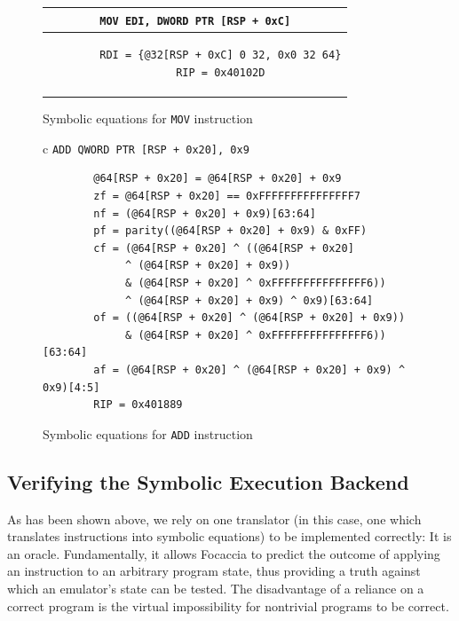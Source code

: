 \begin{figure}[htbp]
    \centering
    \begin{tabular}{c}
    \texttt{MOV        EDI, DWORD PTR [RSP + 0xC]} \\
    \midrule
    \begin{lstlisting}
        RDI = {@32[RSP + 0xC] 0 32, 0x0 32 64}
        RIP = 0x40102D
    \end{lstlisting}
    \end{tabular}
    \caption{Symbolic equations for \texttt{MOV} instruction}\label{fig:symb_equation_mov}
\end{figure}

\begin{figure}[htbp]
    \centering
    \begin{tabular}{c}
    \texttt{ADD        QWORD PTR [RSP + 0x20], 0x9} \\
    \midrule
    \begin{lstlisting}
        @64[RSP + 0x20] = @64[RSP + 0x20] + 0x9
        zf = @64[RSP + 0x20] == 0xFFFFFFFFFFFFFFF7
        nf = (@64[RSP + 0x20] + 0x9)[63:64]
        pf = parity((@64[RSP + 0x20] + 0x9) & 0xFF)
        cf = (@64[RSP + 0x20] ^ ((@64[RSP + 0x20]
             ^ (@64[RSP + 0x20] + 0x9))
             & (@64[RSP + 0x20] ^ 0xFFFFFFFFFFFFFFF6))
             ^ (@64[RSP + 0x20] + 0x9) ^ 0x9)[63:64]
        of = ((@64[RSP + 0x20] ^ (@64[RSP + 0x20] + 0x9))
             & (@64[RSP + 0x20] ^ 0xFFFFFFFFFFFFFFF6))[63:64]
        af = (@64[RSP + 0x20] ^ (@64[RSP + 0x20] + 0x9) ^ 0x9)[4:5]
        RIP = 0x401889
    \end{lstlisting}
    \end{tabular}
    \caption[]{Symbolic equations for \texttt{ADD} instruction}\label{fig:symb_equation_add}
\end{figure}

\subsection{Verifying the Symbolic Execution Backend}\label{sec:symb_exec_backend}

As has been shown above, we rely on one translator (in this case, one which translates instructions into symbolic
equations) to be implemented correctly: It is an oracle. Fundamentally, it allows Focaccia to predict the outcome of
applying an instruction to an arbitrary program state, thus providing a truth against which an emulator's state can be
tested. The disadvantage of a reliance on a correct program is the virtual impossibility for nontrivial programs to be
correct.

